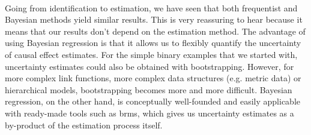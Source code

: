 \documentclass[nobib]{tufte-handout}
\begin{document}
\begin{marginfigure}[-7cm]
  \centering
  \\
  \vspace{0.5cm}

  \caption{Missing data can lead to problems identifying causal effects.}
  \label{fig:cDAGs-missing}
\end{marginfigure}

Going from identification to estimation, we have seen that both frequentist and Bayesian methods yield similar results. 
This is very reassuring to hear because it means that our results don't depend on the estimation method. 
The advantage of using Bayesian regression is that it allows us to flexibly quantify the uncertainty of causal effect estimates.
For the simple binary examples that we started with, uncertainty estimates could also be obtained with bootstrapping.
However, for more complex link functions, more complex data structures (e.g. metric data) or hierarchical models, bootstrapping becomes more and more difficult. 
Bayesian regression, on the other hand, is conceptually well-founded and easily applicable with ready-made tools such as brms, which gives us uncertainty estimates as a by-product of the estimation process itself. 
\end{document}
